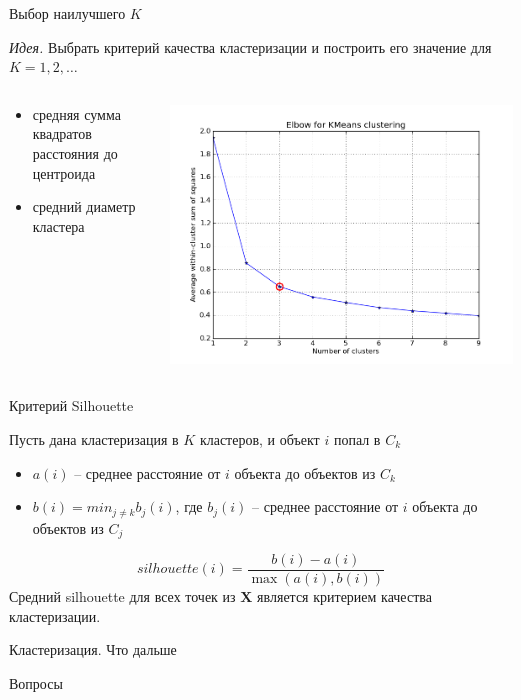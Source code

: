\documentclass[10pt]{beamer}
\begin{document}
\begin{frame}{Выбор наилучшего $K$}

{\it Идея.} Выбрать критерий качества кластеризации и построить его значение для $K = 1, 2, \ldots$

\begin{columns}[C]
    \begin{column}{.5\textwidth} 
    \begin{itemize}
	\item средняя сумма квадратов расстояния до центроида
	\item средний диаметр кластера
	\end{itemize} 		    
    \end{column}
    \begin{column}{.5\textwidth}
    \vspace{1em}
    \includegraphics[scale=0.3]{images/elbow.png}    
    \end{column}
\end{columns}

\end{frame}

\begin{frame}{Критерий Silhouette}

Пусть дана кластеризация в $K$ кластеров, и объект $i$ попал в $C_k$

\vspace{1em}
\begin{itemize}
\item $a(i)$ -- среднее расстояние от $i$ объекта до объектов из $C_k$
\item $b(i) = min_{j \neq k} b_j(i)$,  где $b_j(i)$ -- среднее расстояние от $i$ объекта до объектов из $C_j$
\end{itemize}
\[
silhouette(i) = \frac{b(i) - a(i)}{\max(a(i), b(i))}
\]
Средний silhouette для всех точек из $\mathbf{X}$ является критерием качества кластеризации.

\end{frame}

\begin{frame}{Кластеризация. Что дальше}

\end{frame}

\begin{frame}[plain]
\begin{center}
{\Large Вопросы}
\end{center}
\end{frame}
\end{document}
